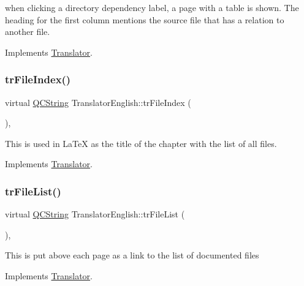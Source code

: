 when clicking a directory dependency label, a page with a table is shown. The heading for the first column mentions the source file that has a relation to another file. 

Implements \mbox{\hyperlink{class_translator}{Translator}}.

\mbox{\label{class_translator_english_a30c7d39b1293e5b80a3aa2061384d809}} 
\subsubsection{\texorpdfstring{trFileIndex()}{trFileIndex()}}
{\footnotesize\ttfamily virtual \mbox{\hyperlink{class_q_c_string}{Q\+C\+String}} Translator\+English\+::tr\+File\+Index (\begin{DoxyParamCaption}{ }\end{DoxyParamCaption})\hspace{0.3cm}{\ttfamily [inline]}, {\ttfamily [virtual]}}

This is used in La\+TeX as the title of the chapter with the list of all files. 

Implements \mbox{\hyperlink{class_translator}{Translator}}.

\mbox{\label{class_translator_english_a89891be5af0b33adfb930f376994f982}} 
\subsubsection{\texorpdfstring{trFileList()}{trFileList()}}
{\footnotesize\ttfamily virtual \mbox{\hyperlink{class_q_c_string}{Q\+C\+String}} Translator\+English\+::tr\+File\+List (\begin{DoxyParamCaption}{ }\end{DoxyParamCaption})\hspace{0.3cm}{\ttfamily [inline]}, {\ttfamily [virtual]}}

This is put above each page as a link to the list of documented files 

Implements \mbox{\hyperlink{class_translator}{Translator}}.

\mbox{\label{class_translator_english_abfddc291a8ee42dd055bad517b5b2ea7}} 
